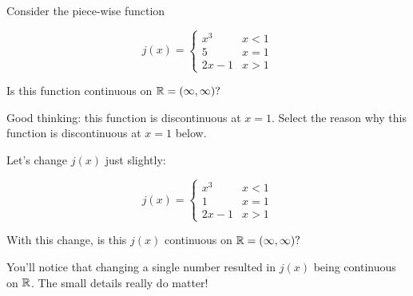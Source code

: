 \documentclass[handout]{ximera}
\begin{document}
\begin{exercise}
Consider the piece-wise function 

\[
j(x) = \begin{cases}
  x^3  & x < 1 \\
  5 & x=1 \\
  2x-1 & x > 1
\end{cases}
\]

Is this function continuous on $\mathbb R = (\infty, \infty)?$  

\begin{multipleChoice}
\end{multipleChoice}

\begin{exercise}

Good thinking: this function is discontinuous at $x=1$.  Select the reason why this function is discontinuous at $x=1$ below.

\begin{multipleChoice}
\end{multipleChoice}

\begin{exercise}

Let's change $j(x)$ just slightly: 

\[
j(x) = \begin{cases}
  x^3  & x < 1 \\
  1 & x=1 \\ 
  2x-1 & x > 1
\end{cases}
\]

With this change, is this $j(x)$ continuous on $\mathbb R = (\infty, \infty)?$  

\begin{multipleChoice}
    
\begin{feedback}[correct]
You'll notice that changing a single number resulted in $j(x)$ being continuous on $\mathbb R$.  The small details really do matter!   
\end{feedback}
\end{multipleChoice}

\end{exercise}
\end{exercise}
\end{exercise}
\end{document}
